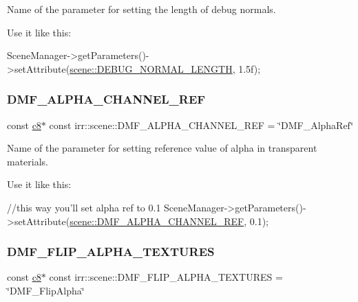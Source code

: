 Name of the parameter for setting the length of debug normals. 

Use it like this\+: 
\begin{DoxyCode}
SceneManager->getParameters()->setAttribute(\hyperlink{namespaceirr_1_1scene_a19153395855d08302b70dcfa9247eb51}{scene::DEBUG\_NORMAL\_LENGTH}, 1.5f);
\end{DoxyCode}
 \mbox{\label{namespaceirr_1_1scene_afd6e025453e80983de80371dc56718ef}} 
\subsubsection{\texorpdfstring{D\+M\+F\+\_\+\+A\+L\+P\+H\+A\+\_\+\+C\+H\+A\+N\+N\+E\+L\+\_\+\+R\+EF}{DMF\_ALPHA\_CHANNEL\_REF}}
{\footnotesize\ttfamily const \hyperlink{namespaceirr_a9395eaea339bcb546b319e9c96bf7410}{c8}$\ast$ const irr\+::scene\+::\+D\+M\+F\+\_\+\+A\+L\+P\+H\+A\+\_\+\+C\+H\+A\+N\+N\+E\+L\+\_\+\+R\+EF = \char`\"{}D\+M\+F\+\_\+\+Alpha\+Ref\char`\"{}}



Name of the parameter for setting reference value of alpha in transparent materials. 

Use it like this\+: 
\begin{DoxyCode}
\textcolor{comment}{//this way you'll set alpha ref to 0.1}
SceneManager->getParameters()->setAttribute(\hyperlink{namespaceirr_1_1scene_afd6e025453e80983de80371dc56718ef}{scene::DMF\_ALPHA\_CHANNEL\_REF}, 0.1);
\end{DoxyCode}
 \mbox{\label{namespaceirr_1_1scene_acdc1ddd0bfeb4118a5d8f3ea953717f6}} 
\subsubsection{\texorpdfstring{D\+M\+F\+\_\+\+F\+L\+I\+P\+\_\+\+A\+L\+P\+H\+A\+\_\+\+T\+E\+X\+T\+U\+R\+ES}{DMF\_FLIP\_ALPHA\_TEXTURES}}
{\footnotesize\ttfamily const \hyperlink{namespaceirr_a9395eaea339bcb546b319e9c96bf7410}{c8}$\ast$ const irr\+::scene\+::\+D\+M\+F\+\_\+\+F\+L\+I\+P\+\_\+\+A\+L\+P\+H\+A\+\_\+\+T\+E\+X\+T\+U\+R\+ES = \char`\"{}D\+M\+F\+\_\+\+Flip\+Alpha\char`\"{}}



